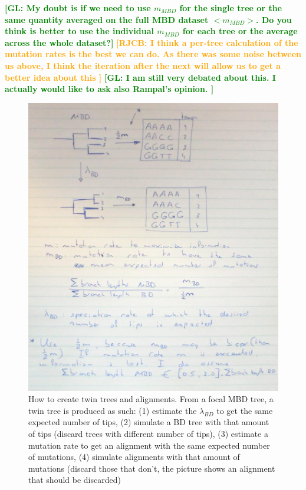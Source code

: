 \documentclass{article}
\newcommand*\richel[1]{\textcolor{orange}{\textbf{[RJCB: #1]}}}
\newcommand*\gio[1]{\textcolor{green}{\textbf{[GL: #1]}}}
\begin{document}
\begin{itemize}
\gio{My doubt is if we need to use $m_{MBD}$ for the single tree or the same
quantity averaged on the full MBD dataset $<m_{MBD}>$.
Do you think is better to use the
individual $m_{MBD}$ for each tree or the average across the whole
dataset?}
\richel{
  I think a per-tree calculation of the mutation rates 
  is the best we can do. As there was some noise between us above,
  I think the iteration after the next will allow us to get a better
  idea about this
}
\gio{I am still very debated about this. I actually would like to ask also Rampal's opinion.
}
\begin{figure}[!htbp]
  \includegraphics[width=\textwidth]{mbd.jpg}
  \caption{
    How to create twin trees and alignments. From a focal MBD tree, a twin tree is produced as 
    such: (1) estimate the $\lambda_{BD}$ to get the same expected number of tips, (2) simulate a BD tree with that amount of tips (discard trees with different number of tips), (3) estimate a mutation rate to get an alignment with the same expected number of mutations, (4) simulate alignments with that amount of mutations (discard those that don't, the picture shows an alignment that should be discarded) 
  }
\end{figure}


\end{itemize}
\end{document}
